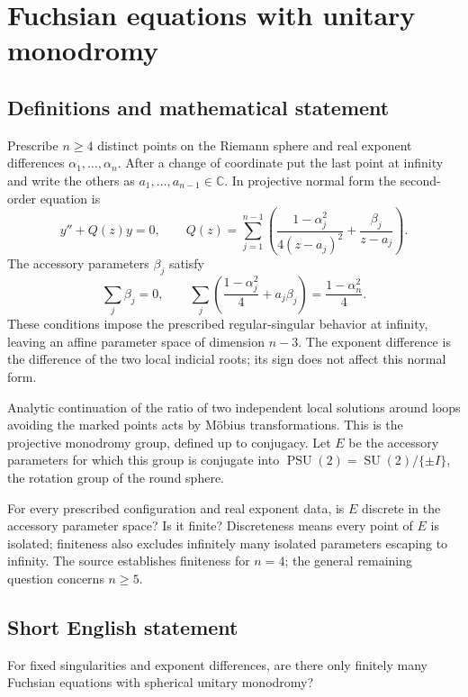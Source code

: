 \documentclass[11pt,a4paper]{article}
\begin{document}
\section*{Fuchsian equations with unitary monodromy}\label{statement}

\subsection{Definitions and mathematical statement}
Prescribe $n\geq4$ distinct points on the Riemann sphere and real
exponent differences $\alpha_1,\ldots,\alpha_n$. After a change of
coordinate put the last point at infinity and write the others
as $a_1,\ldots,a_{n-1}\in\mathbb C$. In projective normal form the
second-order equation is
\[
 y''+Q(z)y=0,\qquad
 Q(z)=\sum_{j=1}^{n-1}
       \left(\frac{1-\alpha_j^2}{4(z-a_j)^2}
                         +\frac{\beta_j}{z-a_j}\right).
\]
The accessory parameters $\beta_j$ satisfy
\[
 \sum_j\beta_j=0,\qquad
 \sum_j\left(\frac{1-\alpha_j^2}{4}+a_j\beta_j\right)
                         =\frac{1-\alpha_n^2}{4}.
\]
These conditions impose the prescribed regular-singular behavior
at infinity, leaving an affine parameter space of dimension $n-3$.
The exponent difference is the difference of the two local
indicial roots; its sign does not affect this normal form.

Analytic continuation of the ratio of two independent local
solutions around loops avoiding the marked points acts by
Möbius transformations. This is the projective monodromy group,
defined up to conjugacy. Let $E$ be the accessory parameters
for which this group is conjugate into
$\operatorname{PSU}(2)=\operatorname{SU}(2)/\{\pm I\}$, the
rotation group of the round sphere.

For every prescribed configuration and real exponent data, is
$E$ discrete in the accessory parameter space? Is it finite?
Discreteness means every point of $E$ is isolated; finiteness
also excludes infinitely many isolated parameters escaping to
infinity. The source establishes finiteness for $n=4$; the
general remaining question concerns $n\geq5$.
\subsection{Short English statement}
For fixed singularities and exponent differences, are there only finitely many Fuchsian equations with spherical unitary monodromy?
\end{document}

